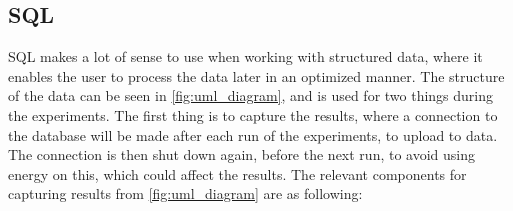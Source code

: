 \subsection{SQL}\label{subsec:sql}

SQL makes a lot of sense to use when working with structured data, where it enables the user to process the data later in an optimized manner. The structure of the data can be seen in \cref{fig:uml_diagram}, and is used for two things during the experiments. The first thing is to capture the results, where a connection to the database will be made after each run of the experiments, to upload to data. The connection is then shut down again, before the next run, to avoid using energy on this, which could affect the results. The relevant components for capturing results from \cref*{fig:uml_diagram} are as following:

